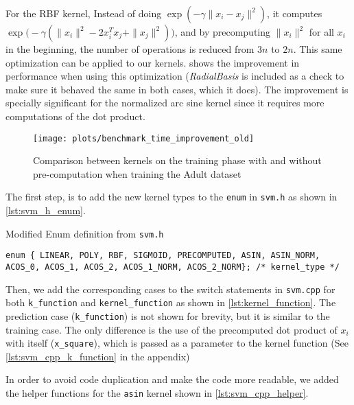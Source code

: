 For the RBF kernel, Instead of doing $\exp\left(-\gamma\|x_i - x_j\|^2\right)$,
it computes $\exp\bigl(-\gamma(\|x_i\|^2 - 2x_i^Tx_j + \|x_j\|^2)\bigr)$, and by
precomputing $\|x_i\|^2$ for all $x_i$ in the beginning, the number of
operations is reduced from $3n$ to $2n$. This same optimization can be applied
to our kernels.  shows the improvement in performance
when using this optimization (\emph{RadialBasis} is included as a check to make
sure it behaved the same in both cases, which it does).
The improvement is specially significant for the
normalized arc sine kernel since it requires more computations of the
dot product.

\begin{figure}[H]
    \texttt{[image: plots/benchmark\_time\_improvement\_old]}
    \caption{Comparison between kernels on the training phase with and without
        pre-computation when training the Adult dataset}%
    \label{fig:c_improvement}
\end{figure}

The first step, is to add the new kernel types to the \texttt{enum} in
\texttt{svm.h} as shown in \cref{lst:svm_h_enum}.
\begin{listing}[H]
    \caption{Modified Enum definition from \texttt{svm.h}}
    \label{lst:svm_h_enum}
    \begin{verbatim}
enum { LINEAR, POLY, RBF, SIGMOID, PRECOMPUTED, ASIN, ASIN_NORM, ACOS_0, ACOS_1, ACOS_2, ACOS_1_NORM, ACOS_2_NORM}; /* kernel_type */
\end{verbatim}
\end{listing}
Then, we add the corresponding cases to the switch statements in
\texttt{svm.cpp} for both \texttt{k\_function} and \texttt{kernel\_function} as
shown in \cref{lst:kernel_function}. The prediction case (\texttt{k\_function})
is not shown for brevity, but it is similar to the training case. The only
difference is the use of the precomputed dot product of $x_i$ with itself
(\texttt{x\_square}), which is passed as a parameter to the kernel function (See
\cref{lst:svm_cpp_k_function} in the appendix)

In order to avoid code duplication and make the code more readable, we added the
helper functions for the \texttt{asin} kernel shown in
\cref{lst:svm_cpp_helper}.

